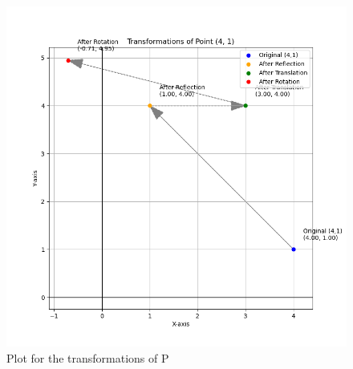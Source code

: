 \documentclass{beamer}
\begin{document}
 \begin{figure}[h]
     \centering
     \includegraphics[width=0.7\linewidth]{figs/fig2.png}
     \caption{Plot for the transformations of P}
     \label{fig2}
 \end{figure}
\end{document}
